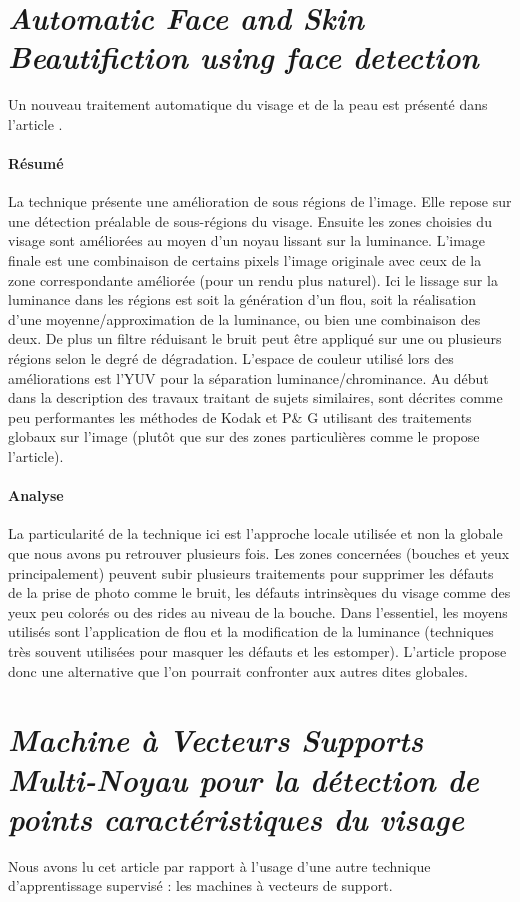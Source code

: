 \documentclass[11pt, french]{report-rd-info}
\begin{document}
\section{\emph{Automatic Face and Skin Beautifiction using face detection}}
Un nouveau traitement automatique du visage et de la peau est présenté dans l’article \cite{Ciuc2010}.
\paragraph{Résumé}
La technique présente une amélioration de sous régions de l’image.  Elle repose sur une détection préalable de sous-régions du visage. Ensuite les zones choisies du visage sont améliorées au moyen d'un noyau lissant sur la luminance. L'image finale est une combinaison de certains pixels l'image originale avec ceux de la zone correspondante améliorée (pour un rendu plus naturel).
Ici le lissage sur la luminance dans les régions est soit la génération d’un flou, soit la réalisation d’une moyenne/approximation de la luminance, ou bien une combinaison des deux. De plus un filtre réduisant le bruit peut être appliqué sur une ou plusieurs régions selon le degré de dégradation.
L’espace de couleur utilisé lors des améliorations est l’YUV pour la séparation luminance/chrominance.
Au début dans la description des travaux traitant de sujets similaires, sont décrites comme peu performantes les méthodes de Kodak et P\& G utilisant des traitements globaux sur l'image (plutôt que sur des zones particulières comme le propose l’article).
\paragraph{Analyse}
La particularité de la technique ici est l’approche locale utilisée et non la globale que nous avons pu retrouver plusieurs fois. Les zones concernées (bouches et yeux principalement) peuvent subir plusieurs traitements pour supprimer les défauts de la prise de photo comme le bruit, les défauts intrinsèques du visage comme des yeux peu colorés ou des rides au niveau de la bouche.
Dans l’essentiel, les moyens utilisés sont l’application de flou et la modification de la luminance (techniques très souvent utilisées pour masquer les défauts et les estomper). L’article propose donc une alternative que l’on pourrait confronter aux autres dites globales.
\section{\emph{Machine à Vecteurs Supports Multi-Noyau pour la détection de points caractéristiques du visage}}
Nous avons lu cet article \cite{Rapp2012} par rapport à l’usage d’une autre technique d’apprentissage supervisé : les machines à vecteurs de support.
\end{document}

